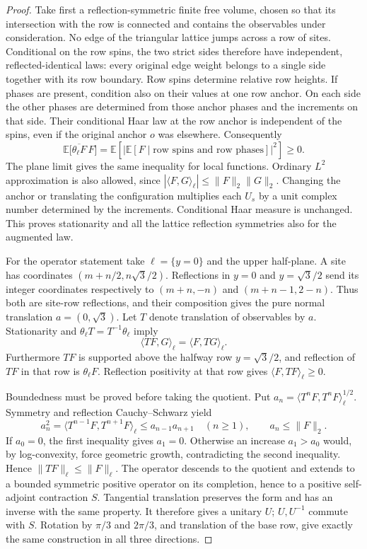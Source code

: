 \documentclass[11pt]{article}
\theoremstyle{definition}
\theoremstyle{remark}
\numberwithin{equation}{section}
\begin{document}
\begin{proof}
Take first a reflection-symmetric finite free volume, chosen so that its
intersection with the row is connected and contains the observables under
consideration.  No edge of the triangular lattice jumps across a row of
sites.  Conditional on the row spins, the two strict sides therefore have
independent, reflected-identical laws: every original edge weight belongs
to a single side together with its row boundary.  Row spins determine
relative row heights.  If phases are present, condition also on their
values at one row anchor.  On each side the other phases are determined
from those anchor phases and the increments on that side.  Their
conditional Haar law at the row anchor is independent of the spins, even
if the original anchor $o$ was elsewhere.  Consequently
\[
 \mathbb E\big[\overline{\theta_\ell F}\,F\big]
   =\mathbb E\left[\left|\mathbb E[F\mid\text{row spins and row phases}]\right|^2\right]
   \ge0.
\]
The plane limit gives the same inequality for local functions.  Ordinary
$L^2$ approximation is also allowed, since
$|\langle F,G\rangle_\ell|\le\|F\|_2\|G\|_2$.
Changing the anchor or translating the configuration multiplies each
$U_s$ by a unit complex number determined by the increments.  Conditional
Haar measure is unchanged.  This proves stationarity and all the lattice
reflection symmetries also for the augmented law.

For the operator statement take $\ell=\{y=0\}$ and the upper half-plane.
A site has coordinates $(m+n/2,n\sqrt3/2)$.  Reflections in $y=0$ and
$y=\sqrt3/2$ send its integer coordinates respectively to
$(m+n,-n)$ and $(m+n-1,2-n)$.  Thus both are site-row reflections, and their
composition gives the pure normal translation $a=(0,\sqrt3)$.
Let $T$ denote translation of observables by $a$.  Stationarity and
$\theta_\ell T=T^{-1}\theta_\ell$ imply
\[
 \langle TF,G\rangle_\ell=\langle F,TG\rangle_\ell.
\]
Furthermore $TF$ is supported above the halfway row $y=\sqrt3/2$, and
reflection of $TF$ in that row is $\theta_\ell F$.  Reflection positivity
at that row gives $\langle F,TF\rangle_\ell\ge0$.

Boundedness must be proved before taking the quotient.  Put
$a_n=\langle T^nF,T^nF\rangle_\ell^{1/2}$.  Symmetry and reflection
Cauchy--Schwarz yield
\[
 a_n^2=\langle T^{n-1}F,T^{n+1}F\rangle_\ell
       \le a_{n-1}a_{n+1}\quad(n\ge1),
 \qquad a_n\le\|F\|_2.
\]
If $a_0=0$, the first inequality gives $a_1=0$.  Otherwise an increase
$a_1>a_0$ would, by log-convexity, force geometric growth, contradicting
the second inequality.  Hence $\|TF\|_\ell\le\|F\|_\ell$.
The operator descends to the quotient and extends to a bounded symmetric
positive operator on its completion, hence to a positive self-adjoint
contraction $S$.  Tangential translation preserves the form and has an
inverse with the same property.  It therefore gives a unitary $U$;
$U,U^{-1}$ commute with $S$.  Rotation by $\pi/3$ and $2\pi/3$, and
translation of the base row, give exactly the same construction in all
three directions.
\end{proof}
\end{document}

